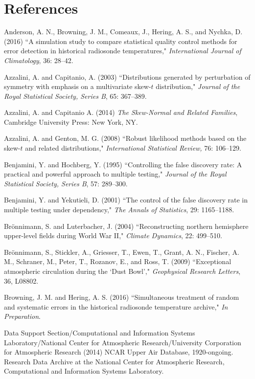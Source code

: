 \documentclass[12pt]{article}
\def\refhg{\hangindent=20pt\hangafter=1}
\def\refmark{\par\vskip 2mm\noindent\refhg}
\def\refhg{\hangindent=20pt\hangafter=1}
\def\refmark{\par\vskip 2mm\noindent\refhg}
\begin{document}


\baselineskip=13.5pt
\section*{References}

\refmark Anderson, A. N., Browning, J. M., Comeaux, J., Hering, A. S., and Nychka, D. (2016) ``A simulation study to compare statistical quality control methods for error detection in historical radiosonde temperatures,"  \emph{International Journal of Climatology}, 36: 28--42.

\refmark Azzalini, A. and Capitanio, A. (2003)  ``Distributions generated by perturbation of symmetry with emphasis on a multivariate skew-$t$ distribution," \emph{Journal of the Royal Statistical Society, Series B}, 65: 367--389.

\refmark Azzalini, A. and Capitanio A. (2014) \emph{The Skew-Normal and Related Families}, Cambridge University Press: New York, NY.

\refmark Azzalini, A. and Genton, M. G. (2008)  ``Robust likelihood methods based on the skew-$t$ and related distributions," \emph{International Statistical Review,} 76:  106--129.

\refmark Benjamini, Y. and Hochberg, Y. (1995) ``Controlling the false discovery rate: A practical and powerful approach to multiple testing," \emph{Journal of the Royal Statistical Society, Series B}, 57: 289--300.

\refmark Benjamini, Y. and  Yekutieli, D. (2001) ``The control of the false discovery rate in multiple testing under dependency," \emph{The Annals of Statistics}, 29: 1165--1188.

\refmark Br\"{o}nnimann, S. and Luterbacher, J. (2004) ``Reconstructing northern hemisphere upper-level fields during World War II," \emph{Climate Dynamics}, 22: 499--510.

\refmark Br\"{o}nnimann, S., Stickler, A., Griesser, T., Ewen, T., Grant, A. N., Fischer, A. M., Schraner, M.,  Peter, T., Rozanov, E., and Ross, T. (2009) ``Exceptional atmospheric circulation during the `Dust Bowl',"
 \emph{Geophysical Research Letters}, 36, L08802.

\refmark Browning, J. M. and Hering, A. S. (2016) ``Simultaneous treatment of random and systematic errors in the historical radiosonde temperature archive," \emph{In Preparation}.

\refmark Data Support Section/Computational and Information Systems Laboratory/National Center for Atmospheric Research/University Corporation for Atmospheric Research (2014)  NCAR Upper Air Database, 1920-ongoing. Research Data Archive at the National Center for Atmospheric Research, Computational and Information Systems Laboratory. 
\end{document}
